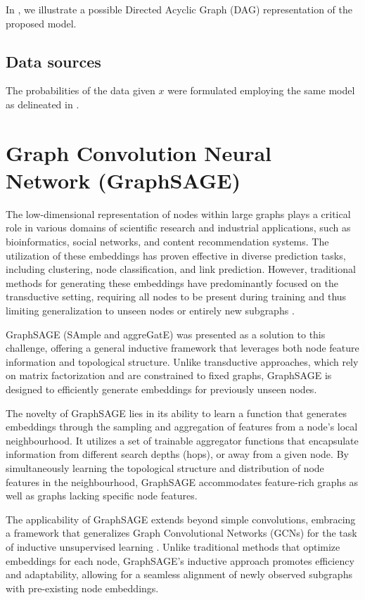 \documentclass[
11pt, %
oneside, %
english, %
singlespacing, %
headsepline, %
chapterinoneline, %
]{MastersDoctoralThesis} %
\begin{document}
In , we illustrate a possible Directed Acyclic Graph (DAG) representation of the proposed model.

\subsection{Data sources}
The probabilities of the data given $x$ were formulated employing the same model as delineated in .

\section{Graph Convolution Neural Network (GraphSAGE)}\label{sec:theory:HinSAGE}
The low-dimensional representation of nodes within large graphs plays a critical role in various domains of scientific research and industrial applications, such as bioinformatics, social networks, and content recommendation systems. The utilization of these embeddings has proven effective in diverse prediction tasks, including clustering, node classification, and link prediction. However, traditional methods for generating these embeddings have predominantly focused on the transductive setting, requiring all nodes to be present during training and thus limiting generalization to unseen nodes or entirely new subgraphs \cite{groverNode2vecScalableFeature2016, perozziDeepWalkOnlineLearning2014}.

GraphSAGE (SAmple and aggreGatE) \cite{hamiltonInductiveRepresentationLearning2017} was presented as a solution to this challenge, offering a general inductive framework that leverages both node feature information and topological structure. Unlike transductive approaches, which rely on matrix factorization and are constrained to fixed graphs, GraphSAGE is designed to efficiently generate embeddings for previously unseen nodes.

The novelty of GraphSAGE lies in its ability to learn a function that generates embeddings through the sampling and aggregation of features from a node's local neighbourhood. It utilizes a set of trainable aggregator functions that encapsulate information from different search depths (hops), or away from a given node. By simultaneously learning the topological structure and distribution of node features in the neighbourhood, GraphSAGE accommodates feature-rich graphs as well as graphs lacking specific node features.

The applicability of GraphSAGE extends beyond simple convolutions, embracing a framework that generalizes Graph Convolutional Networks (GCNs) for the task of inductive unsupervised learning \cite{kipfSemiSupervisedClassificationGraph2016}. Unlike traditional methods that optimize embeddings for each node, GraphSAGE's inductive approach promotes efficiency and adaptability, allowing for a seamless alignment of newly observed subgraphs with pre-existing node embeddings.
\end{document}
